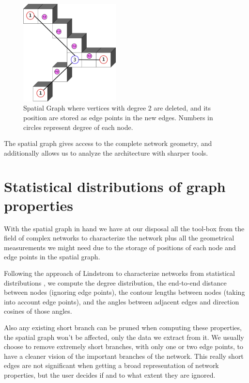 \begin{figure}[!htb]
  \centering
  \includegraphics[width=0.45\textwidth]{Figures/chapter-image/dgtal/voxels_spatial_merge.png}%
  \caption{\gls{Spatial Graph} where vertices with degree 2 are deleted, and its position are stored as edge points in the new edges. Numbers in circles represent degree of each node.}
  \label{fig:spatial_graph}
\end{figure}

The spatial graph gives access to the complete network geometry, and additionally allows us to analyze the architecture with sharper tools.

\section{Statistical distributions of graph properties}%
\label{sec:statistical_distributions_of_graph_properties}

With the spatial graph in hand we have at our disposal all the tool-box from the field of
complex networks to characterize the network plus all the geometrical measurements we might need due to the storage of positions of each node and edge points in the spatial graph.

Following the approach of Lindstrom to characterize networks from statistical distributions \cite{lindstrom_finite-strain_2013, lindstrom_biopolymer_2010}, we compute the degree distribution, the end-to-end distance between nodes (ignoring edge points), the contour lengths between nodes (taking into account edge points), and the angles between adjacent edges and direction cosines of those angles.

Also any existing short branch can be pruned when computing these properties, the spatial graph won't be affected, only the data we extract from it. We usually choose to remove extremely short branches, with only one or two edge points, to have a cleaner vision of the important branches of the network. This really short edges are not significant when getting a broad representation of network properties, but the user decides if and to what extent they are ignored.

